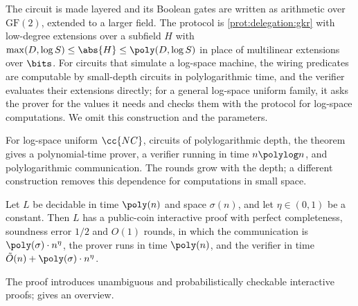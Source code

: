 \begin{refsection}
\begin{proofsketch}
The circuit is made layered and its Boolean gates are written as arithmetic over $\mathrm{GF}(2)$, extended to a larger field. The protocol is \cref{prot:delegation:gkr} with low-degree extensions over a subfield $H$ with $\max(D,\log S)\le\abs{H}\le\poly(D,\log S)$ in place of multilinear extensions over $\bits$. For circuits that simulate a log-space machine, the wiring predicates are computable by small-depth circuits in polylogarithmic time, and the verifier evaluates their extensions directly; for a general log-space uniform family, it asks the prover for the values it needs and checks them with the protocol for log-space computations. We omit this construction \parencite[\S4]{GoldwasserKalaiRothblum2015} and the parameters.
\end{proofsketch}

For log-space uniform $\cc{NC}$, circuits of polylogarithmic depth, the theorem gives a polynomial-time prover, a verifier running in time $n\polylog n$, and polylogarithmic communication. The rounds grow with the depth; a different construction removes this dependence for computations in small space.

\begin{theorem}\label{thm:delegation:rrr}
Let $L$ be decidable in time $\poly(n)$ and space $\sigma(n)$, and let $\eta\in(0,1)$ be a constant. Then $L$ has a public-coin interactive proof with perfect completeness, soundness error $1/2$ and $O(1)$ rounds, in which the communication is $\poly(\sigma)\cdot n^\eta$, the prover runs in time $\poly(n)$, and the verifier in time $\tilde O(n)+\poly(\sigma)\cdot n^\eta$.
\end{theorem}

The proof introduces unambiguous and probabilistically checkable interactive proofs; \textcite{Goldreich2018} gives an overview.


\end{refsection}

